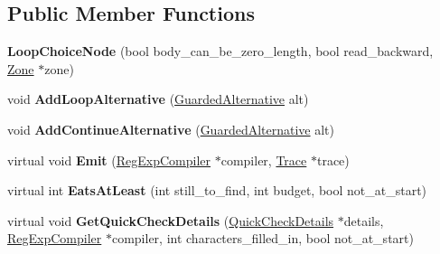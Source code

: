 \subsection*{Public Member Functions}
\begin{DoxyCompactItemize}
\item 
{\bfseries Loop\+Choice\+Node} (bool body\+\_\+can\+\_\+be\+\_\+zero\+\_\+length, bool read\+\_\+backward, \hyperlink{classv8_1_1internal_1_1_zone}{Zone} $\ast$zone)\hypertarget{classv8_1_1internal_1_1_loop_choice_node_a6145f60393ade0f9ff2d1a674f8e7822}{}\label{classv8_1_1internal_1_1_loop_choice_node_a6145f60393ade0f9ff2d1a674f8e7822}

\item 
void {\bfseries Add\+Loop\+Alternative} (\hyperlink{classv8_1_1internal_1_1_guarded_alternative}{Guarded\+Alternative} alt)\hypertarget{classv8_1_1internal_1_1_loop_choice_node_a815bc1ebd29be2a63d8d69991c3a44c1}{}\label{classv8_1_1internal_1_1_loop_choice_node_a815bc1ebd29be2a63d8d69991c3a44c1}

\item 
void {\bfseries Add\+Continue\+Alternative} (\hyperlink{classv8_1_1internal_1_1_guarded_alternative}{Guarded\+Alternative} alt)\hypertarget{classv8_1_1internal_1_1_loop_choice_node_a30882e49330a344892de6024e1a9138c}{}\label{classv8_1_1internal_1_1_loop_choice_node_a30882e49330a344892de6024e1a9138c}

\item 
virtual void {\bfseries Emit} (\hyperlink{classv8_1_1internal_1_1_reg_exp_compiler}{Reg\+Exp\+Compiler} $\ast$compiler, \hyperlink{classv8_1_1internal_1_1_trace}{Trace} $\ast$trace)\hypertarget{classv8_1_1internal_1_1_loop_choice_node_ae7f3eb93d0ed5bc473764b2db7729190}{}\label{classv8_1_1internal_1_1_loop_choice_node_ae7f3eb93d0ed5bc473764b2db7729190}

\item 
virtual int {\bfseries Eats\+At\+Least} (int still\+\_\+to\+\_\+find, int budget, bool not\+\_\+at\+\_\+start)\hypertarget{classv8_1_1internal_1_1_loop_choice_node_adf3e929b831ea3c23156112a50a4c2f4}{}\label{classv8_1_1internal_1_1_loop_choice_node_adf3e929b831ea3c23156112a50a4c2f4}

\item 
virtual void {\bfseries Get\+Quick\+Check\+Details} (\hyperlink{classv8_1_1internal_1_1_quick_check_details}{Quick\+Check\+Details} $\ast$details, \hyperlink{classv8_1_1internal_1_1_reg_exp_compiler}{Reg\+Exp\+Compiler} $\ast$compiler, int characters\+\_\+filled\+\_\+in, bool not\+\_\+at\+\_\+start)\hypertarget{classv8_1_1internal_1_1_loop_choice_node_a446b56f3550c63ef2b8a3a732e5f714b}{}\label{classv8_1_1internal_1_1_loop_choice_node_a446b56f3550c63ef2b8a3a732e5f714b}


\end{DoxyCompactItemize}
